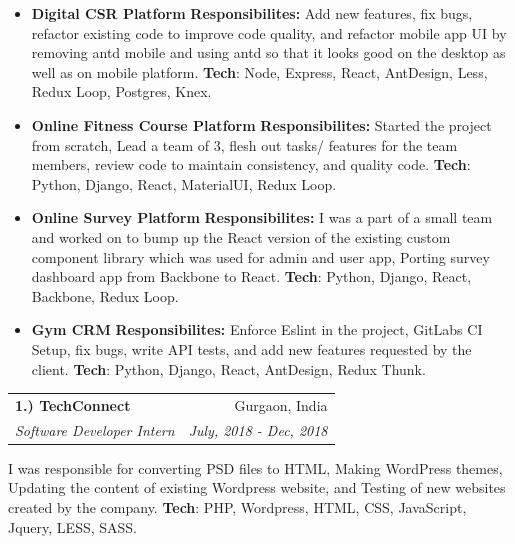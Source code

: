 \documentclass[11pt, a4paper]{article}
\begin{document}
\begin{flushleft}
\begin{itemize}
    \item {\bf{Digital CSR Platform}}
    \newline
    \textbf{Responsibilites:} Add new features, fix bugs, refactor existing code to improve code quality, and refactor mobile app UI by removing antd mobile and using antd so that it looks good on the desktop as well as on mobile platform.
    \newline
    \textbf{Tech}: Node, Express, React, AntDesign, Less, Redux Loop, Postgres, Knex. 

    \item \textbf{Online Fitness Course Platform}
    \newline
    \textbf{Responsibilites:} Started the project from scratch, Lead a team of 3, flesh out tasks/ features for the team members, review code to maintain consistency, and quality code.
    \newline
    \textbf{Tech}: Python, Django, React, MaterialUI, Redux Loop.

    \item \textbf{Online Survey Platform}
    \newline
    \textbf{Responsibilites:} I was a part of a small team and worked on to bump up the React version of the existing custom component library which was used for admin and user app, Porting survey dashboard app from Backbone to React.
    \newline
    \textbf{Tech}: Python, Django, React, Backbone, Redux Loop.

    \item \textbf{Gym CRM}
    \newline
    \textbf{Responsibilites:} Enforce Eslint in the project, GitLabs CI Setup, fix bugs, write API tests, and add new features requested by the client.
    \newline
    \textbf{Tech}: Python, Django, React, AntDesign, Redux Thunk.
    \newline
\end{itemize}

\setlength\tabcolsep{0pt}
\begin{tabularx}{\textwidth}{X r}
    \large{\textbf{1.) TechConnect}} & Gurgaon, India\\
    \textit{Software Developer Intern}  & \textit {July, 2018 - Dec, 2018}\\
\end{tabularx}
\newline
\newline
I was responsible for converting PSD files to HTML, Making WordPress themes, Updating the content of existing Wordpress website, and Testing of new websites created by the company.
\newline
\textbf{Tech}: PHP, Wordpress, HTML, CSS, JavaScript, Jquery, LESS, SASS.
\newline


\end{flushleft}
\end{document}
